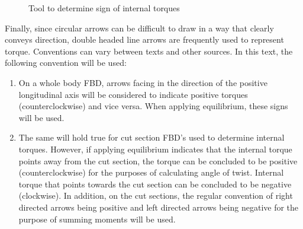 \documentclass[
  letterpaper,
  DIV=11,
  numbers=noendperiod]{scrreprt}
\providecommand{\tightlist}{%
  \setlength{\itemsep}{0pt}\setlength{\parskip}{0pt}}\usepackage{longtable,booktabs,array}
\theoremstyle{definition}
\theoremstyle{remark}
\begin{document}
\begin{figure}


\caption{\label{fig-6.7}Tool to determine sign of internal torques}

\end{figure}%

Finally, since circular arrows can be difficult to draw in a way that
clearly conveys direction, double headed line arrows are frequently used
to represent torque. Conventions can vary between texts and other
sources. In this text, the following convention will be used:

\begin{enumerate}
\def\labelenumi{\arabic{enumi}.}
\tightlist
\item
  On a whole body FBD, arrows facing in the direction of the positive
  longitudinal axis will be considered to indicate positive torques
  (counterclockwise) and vice versa. When applying equilibrium, these
  signs will be used.
\item
  The same will hold true for cut section FBD's used to determine
  internal torques. However, if applying equilibrium indicates that the
  internal torque points away from the cut section, the torque can be
  concluded to be positive (counterclockwise) for the purposes of
  calculating angle of twist. Internal torque that points towards the
  cut section can be concluded to be negative (clockwise). In addition,
  on the cut sections, the regular convention of right directed arrows
  being positive and left directed arrows being negative for the purpose
  of summing moments will be used.
\end{enumerate}
\end{document}
